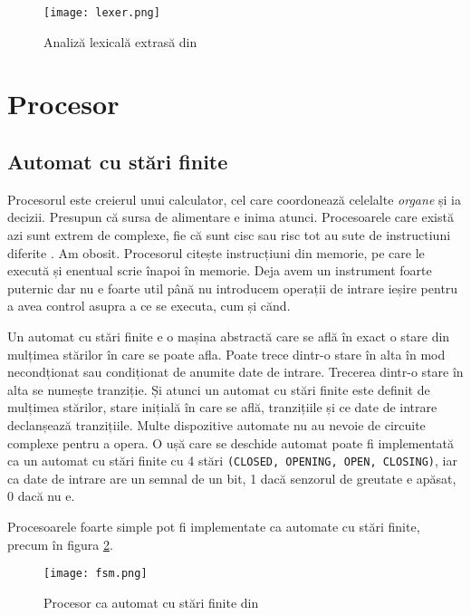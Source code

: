 \documentclass[../main.tex]{subfiles}
\begin{document}
\begin{figure}[h]
    \centering
    \texttt{[image: lexer.png]}
    \caption{Analiză lexicală extrasă din \cite{lexer}}
    \label{fig:lexer}
\end{figure}

\section{Procesor}
\subsection{Automat cu stări finite}
Procesorul este creierul unui calculator, cel care coordonează celelalte \emph{organe} și ia decizii. Presupun că sursa
de alimentare e inima atunci. Procesoarele care există azi sunt extrem de complexe, fie că sunt \acrfull{cisc} sau
\acrfull{risc} tot au sute de instructiuni diferite \cite{intel64}. Am obosit. Procesorul citește instrucțiuni din memorie,
pe care le execută și enentual scrie înapoi în memorie. Deja avem un instrument foarte puternic dar nu e foarte util
până nu introducem operații de intrare ieșire pentru a avea control asupra a ce se executa, cum și cănd.

Un automat cu stări finite e o mașina abstractă care se află în exact o stare din mulțimea stărilor în care se poate afla.
Poate trece dintr-o stare în alta în mod necondționat sau condiționat de anumite date de intrare. Trecerea dintr-o stare
în alta se numește tranziție. Și atunci un automat cu stări finite este definit de mulțimea stărilor, stare inițială în care
se află, tranzițiile și ce date de intrare declanșează tranzițiile. Multe dispozitive automate nu au nevoie de circuite
complexe pentru a opera. O ușă care se deschide automat poate fi implementată ca un automat cu stări finite cu 4 stări
\texttt{(CLOSED, OPENING, OPEN, CLOSING)}, iar ca date de intrare are un semnal de un bit, 1 dacă senzorul de greutate
e apăsat, 0 dacă nu e.

Procesoarele foarte simple pot fi implementate ca automate cu stări finite, precum în figura \ref{fig:fsm}.

\begin{figure}[h]
    \centering
    \texttt{[image: fsm.png]}
    \caption{Procesor ca automat cu stări finite din \cite{fsm}}
    \label{fig:fsm}
\end{figure}
\end{document}

